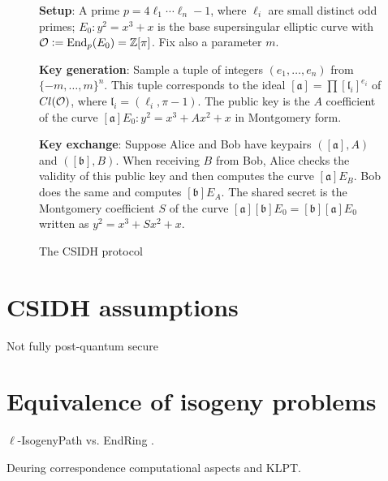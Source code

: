 \begin{figure}
    \begin{framed}
        \textbf{Setup}: A prime $p=4\ell_1\cdots\ell_n-1$, where $\ell_i$ are small distinct odd primes; $E_0:y^2=x^3+x$ is the base supersingular elliptic curve with $\mathcal{O}:=\operatorname{End}_p(E_0)=\mathbb{Z}[\pi]$. Fix also a parameter $m$.
        
        \textbf{Key generation}: Sample a tuple of integers $(e_1,\dots,e_n)$ from $\{ -m,\dots,m \}^n$. This tuple corresponds to the ideal $[\mathfrak{a}] = \prod [\mathfrak{l}_i]^{e_i}$ of $Cl(\mathcal{O})$, where $\mathfrak{l}_i=(\ell_i, \pi-1)$. The public key is the $A$ coefficient of the curve $[\mathfrak{a}]E_0:y^2=x^3+Ax^2+x$ in Montgomery form.
        
        \textbf{Key exchange}: Suppose Alice and Bob have keypairs $([\mathfrak{a}], A)$ and $([\mathfrak{b}], B)$. When receiving $B$ from Bob, Alice checks the validity of this public key and then computes the curve $[\mathfrak{a}]E_B$. Bob does the same and computes $[\mathfrak{b}]E_A$. The shared secret is the Montgomery coefficient $S$ of the curve $[\mathfrak{a}][\mathfrak{b}]E_0=[\mathfrak{b}][\mathfrak{a}]E_0$ written as $y^2=x^3+Sx^2+x$.
    \end{framed}
    \caption{The CSIDH protocol}
    \label{prot_CSIDH}
\end{figure}


\section{CSIDH assumptions}
Not fully post-quantum secure

\cite{breaking_DDH}

\section{Equivalence of isogeny problems}
$\ell$-IsogenyPath vs. EndRing \cite{Weso_EndRing}.

Deuring correspondence computational aspects and KLPT.

\cite{Weso_CSIDH}
